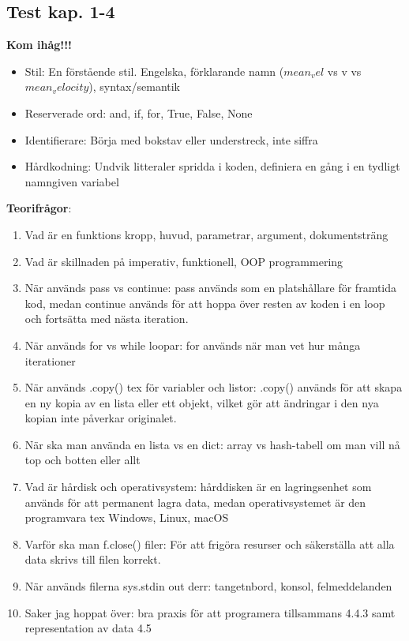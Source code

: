 \documentclass[11pt,a4paper]{article}
\begin{document}
\subsection{Test kap. 1-4}

\textbf{Kom ihåg!!!}
\begin{itemize}
    \item Stil: En förstående stil. Engelska, förklarande namn ($mean_vel$ vs v vs $mean_velocity$), syntax/semantik
    \item Reserverade ord: and, if, for, True, False, None
    \item Identifierare: Börja med bokstav eller understreck, inte siffra
    \item Hårdkodning: Undvik litteraler spridda i koden, definiera en gång i en tydligt namngiven variabel
\end{itemize}


\textbf{Teorifrågor}:
\begin{enumerate}
    \item Vad är en funktions kropp, huvud, parametrar, argument, dokumentsträng
    \item Vad är skillnaden på imperativ, funktionell, OOP programmering
    \item När används pass vs continue: pass används som en platshållare för framtida kod, medan continue används för att hoppa över resten av koden i en loop och fortsätta med nästa iteration.
    \item När används for vs while loopar: for används när man vet hur många iterationer
    \item När används .copy() tex för variabler och listor: .copy() används för att skapa en ny kopia av en lista eller ett objekt, vilket gör att ändringar i den nya kopian inte påverkar originalet.
    \item När ska man använda en lista vs en dict: array vs hash-tabell om man vill nå top och botten eller allt
    \item Vad är hårdisk och operativsystem: hårddisken är en lagringsenhet som används för att permanent lagra data, medan operativsystemet är den programvara tex Windows, Linux, macOS
    \item Varför ska man f.close() filer: För att frigöra resurser och säkerställa att alla data skrivs till filen korrekt.
    \item När används filerna sys.stdin out derr: tangetnbord, konsol, felmeddelanden
    \item Saker jag hoppat över: bra praxis för att programera tillsammans 4.4.3 samt representation av data 4.5
\end{enumerate}
\end{document}
